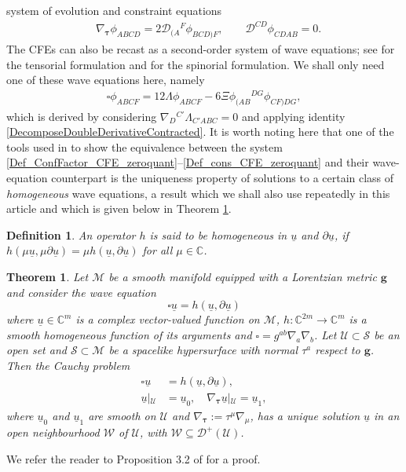 \documentclass[10pt,a4paper]{article}
\theoremstyle{plain}
\newtheorem{theorem}{Theorem}
\newtheorem*{definition}{Definition}
\def\bmg{{\bm g}}
\begin{document}
system of evolution and constraint equations
\begin{align}\label{RescaledWeyl_evo_const}
  & \nabla_{\bm\tau} \phi _{ABCD} = 2 \mathcal{D}
  _{(A}{}^{F}\phi_{BCD)F}, \qquad \mathcal{D} ^{CD}\phi _{CDAB} = 0.
\end{align}
The CFEs can also be recast as a second-order system of wave
equations; see \cite{Pae13} for the tensorial formulation and
\cite{GasVal15} for the spinorial formulation.  We shall only need one
of these wave equations here, namely
\begin{eqnarray}
  \square \phi _{ABCF} = 12 \Lambda \phi _{ABCF} -6 \Xi \phi
  _{(AB}{}^{DG}\phi _{CF)DG},
  \label{Wave_eq_CFE_Weyl}
\end{eqnarray}
which is derived by considering $\nabla_D{}^{C'}\Lambda _{C'ABC}=0$ and
applying identity \eqref{DecomposeDoubleDerivativeContracted}.  It is
worth noting here that one of the tools used in \cite{GasVal15} to
show the equivalence between the system
\eqref{Def_ConfFactor_CFE_zeroquant}--\eqref{Def_cons_CFE_zeroquant}
and their wave-equation counterpart is the uniqueness property of
solutions to a certain class of \textit{homogeneous} wave equations, a
result which we shall also use repeatedly in this article and which is given below in
Theorem \ref{TheoremHomogeneousWave}.

\begin{definition}
{\em An operator $h$ is said to be \textit{homogeneous in} $\underline{u}$
\textit{and} $\partial\underline{u}$, if
$h (\mu\underline{u},\mu\partial\underline{u})=\mu
h(\underline{u}, \partial\underline{u})$ for all
$\mu\in\mathbb{C}$. }
\end{definition}

\begin{theorem}
\label{TheoremHomogeneousWave}
 Let $\mathcal{M}$ be a smooth manifold equipped with a Lorentzian
 metric $\bmg$ and consider the wave equation
\[\square \underline{u}=h (\underline{u},\partial\underline{u})\]
where $\underline{u}\in\mathbb{C}^m$ is a complex vector-valued
function on $\mathcal{M}$, $h:\mathbb{C}^{2m}\rightarrow\mathbb{C}^m$
is a smooth homogeneous function of its arguments and
$\square=g^{ab}\nabla_{a}\nabla_{b}$.  Let
$\mathcal{U}\subset\mathcal{S}$ be an open set and $\mathcal{S}\subset
\mathcal{M}$ be a spacelike hypersurface with normal $\tau^{a}$
respect to $\bmg$. Then the Cauchy problem
\begin{align*}
\square \underline{u}&=h (\underline{u},
\partial\underline{u}),\\ \underline{u}\left|_{\mathcal{U}}\right.&=\underline{u}_0,
\quad
\nabla_{\bm\tau}\underline{u}\left|_{\mathcal{U}}\right.=\underline{u}_1,
\end{align*} 
where $\underline{u}_{0}$ and $\underline{u}_{1}$ are smooth on
$\mathcal{U}$ and $\nabla_{\bm\tau}:= \tau^\mu\nabla_\mu$, has a
unique solution $\underline{u}$ in an open neighbourhood $\mathcal{W}$ of
$\mathcal{U}$, with $\mathcal{W} \subseteq\mathcal{D}^+(\mathcal{U})$.
\end{theorem}
We refer the reader to Proposition 3.2 of \cite{Tay96c} for a proof.
\end{document}
